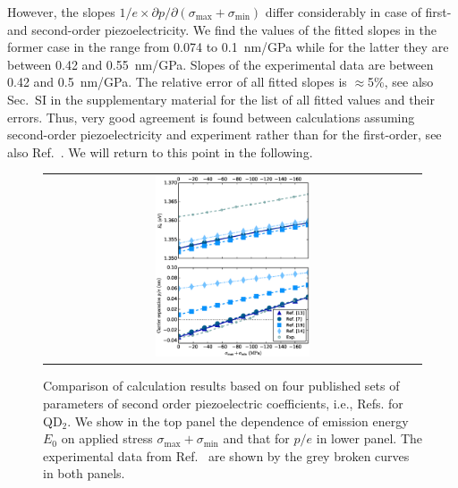 \documentclass[aps,prl,amsmath,amssymb,twocolumn,showpacs,showkeys,superscriptaddress]{revtex4-1}
\begin{document}
However, the slopes $1/e\times\partial p/\partial(\sigma_{\mathrm{max}}+\sigma_{\mathrm{min}})$ differ considerably in case of first- and second-order piezoelectricity. We find the values of the fitted slopes in the former case in the range from 0.074 to 0.1~nm/GPa while for the latter they are between 0.42 and 0.55~nm/GPa. Slopes of the experimental data are between 0.42 and 0.5~nm/GPa. The relative error of all fitted slopes is $\approx$5\%, see also Sec.~SI in the supplementary material for the list of all fitted values and their errors. Thus, very good agreement is found between calculations assuming second-order piezoelectricity and experiment rather than for the first-order, see also Ref.~\cite{Aberl:17}. We will return to this point in the following.




\begin{figure}[!ht]
\renewcommand{\tabcolsep}{2pt}
\begin{center}
\begin{tabular}{c}
\includegraphics[width=0.42\textwidth]{2018-02-04__171219_8x8_neotocena_++_nn+_35deg_pres350___40x20x3-25-65_350_piezo2ndorder.eps} \\
\end{tabular}
\end{center}
\caption{
Comparison of calculation results based on four published sets of parameters of second order piezoelectric coefficients, i.e., Refs.\cite{Beya-Wakata2011,Bester:06,Caro:15,Tse2013} for QD$_2$. We show in the top panel the dependence of emission energy $E_0$ on applied stress $\sigma_{\mathrm{max}}+\sigma_{\mathrm{min}}$ and that for $p/e$ in lower panel. The experimental data from Ref.~\cite{Aberl:17} are shown by the grey broken curves in both panels. 
\label{fig:DiffPiezo}}
\end{figure}
\end{document}
